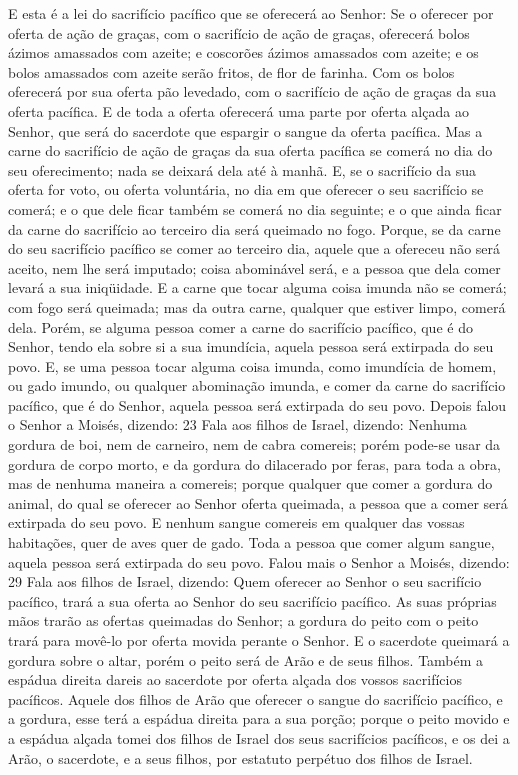 E esta é a lei do sacrifício pacífico que se oferecerá ao Senhor:
Se o oferecer por oferta de ação de graças, com o sacrifício
de ação de graças, oferecerá bolos ázimos amassados com azeite; e
coscorões ázimos amassados com azeite; e os bolos amassados com
azeite serão fritos, de flor de farinha. Com os bolos
oferecerá por sua oferta pão levedado, com o sacrifício de ação de
graças da sua oferta pacífica. E de toda a oferta oferecerá
uma parte por oferta alçada ao Senhor, que será do sacerdote que
espargir o sangue da oferta pacífica. Mas a carne do
sacrifício de ação de graças da sua oferta pacífica se comerá no dia
do seu oferecimento; nada se deixará dela até à manhã. E, se
o sacrifício da sua oferta for voto, ou oferta voluntária, no dia em
que oferecer o seu sacrifício se comerá; e o que dele ficar também
se comerá no dia seguinte; e o que ainda ficar da carne do
sacrifício ao terceiro dia será queimado no fogo. Porque, se
da carne do seu sacrifício pacífico se comer ao terceiro dia, aquele
que a ofereceu não será aceito, nem lhe será imputado; coisa
abominável será, e a pessoa que dela comer levará a sua iniqüidade.
E a carne que tocar alguma coisa imunda não se comerá; com
fogo será queimada; mas da outra carne, qualquer que estiver limpo,
comerá dela. Porém, se alguma pessoa comer a carne do
sacrifício pacífico, que é do Senhor, tendo ela sobre si a sua
imundícia, aquela pessoa será extirpada do seu povo. E, se
uma pessoa tocar alguma coisa imunda, como imundícia de homem, ou
gado imundo, ou qualquer abominação imunda, e comer da carne do
sacrifício pacífico, que é do Senhor, aquela pessoa será extirpada
do seu povo. Depois falou o Senhor a Moisés, dizendo: 23 Fala
aos filhos de Israel, dizendo: Nenhuma gordura de boi, nem de
carneiro, nem de cabra comereis; porém pode-se usar da
gordura de corpo morto, e da gordura do dilacerado por feras, para
toda a obra, mas de nenhuma maneira a comereis; porque
qualquer que comer a gordura do animal, do qual se oferecer ao
Senhor oferta queimada, a pessoa que a comer será extirpada do seu
povo. E nenhum sangue comereis em qualquer das vossas
habitações, quer de aves quer de gado. Toda a pessoa que
comer algum sangue, aquela pessoa será extirpada do seu povo.
Falou mais o Senhor a Moisés, dizendo: 29 Fala aos filhos de
Israel, dizendo: Quem oferecer ao Senhor o seu sacrifício pacífico,
trará a sua oferta ao Senhor do seu sacrifício pacífico. As
suas próprias mãos trarão as ofertas queimadas do Senhor; a gordura
do peito com o peito trará para movê-lo por oferta movida perante o
Senhor. E o sacerdote queimará a gordura sobre o altar, porém
o peito será de Arão e de seus filhos. Também a espádua
direita dareis ao sacerdote por oferta alçada dos vossos sacrifícios
pacíficos. Aquele dos filhos de Arão que oferecer o sangue do
sacrifício pacífico, e a gordura, esse terá a espádua direita para a
sua porção; porque o peito movido e a espádua alçada tomei
dos filhos de Israel dos seus sacrifícios pacíficos, e os dei a
Arão, o sacerdote, e a seus filhos, por estatuto perpétuo dos filhos
de Israel.

